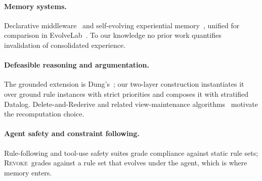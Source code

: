 \documentclass{article} %
\newcommand{\revoke}{\textsc{Revoke}}
\begin{document}
\paragraph{Memory systems.} Declarative middleware~\citep{chhikara2025mem0,li2025memos,rasmussen2025zep} and self-evolving experiential memory~\citep{zhao2024expel,wang2024awm,wang2023voyager,zheng2025skillweaver,suzgun2025dynamic,memevolve}, unified for comparison in EvolveLab~\citep{evolvelab}. To our knowledge no prior work quantifies invalidation of consolidated experience.
\paragraph{Defeasible reasoning and argumentation.} The grounded extension is Dung's~\citep{dung1995acceptability}; our two-layer construction instantiates it over ground rule instances with strict priorities and composes it with stratified Datalog. Delete-and-Rederive and related view-maintenance algorithms~\citep{gupta1993maintaining} motivate the recomputation choice.
\paragraph{Agent safety and constraint following.} Rule-following and tool-use safety suites grade compliance against static rule sets; \revoke\ grades against a rule set that evolves under the agent, which is where memory enters.
\end{document}
